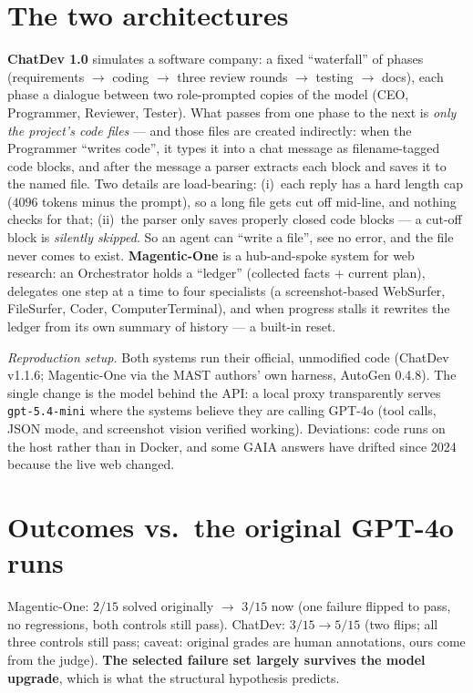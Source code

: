 \documentclass[10pt]{article}
\begin{document}
\section{The two architectures}
\textbf{ChatDev 1.0} simulates a software company: a fixed ``waterfall'' of
phases (requirements $\rightarrow$ coding $\rightarrow$ three review rounds
$\rightarrow$ testing $\rightarrow$ docs), each phase a dialogue between two
role-prompted copies of the model (CEO, Programmer, Reviewer, Tester).
What passes from one phase to the next is \emph{only the project's code
files} --- and those files are created indirectly: when the Programmer
``writes code'', it types it into a chat message as filename-tagged code
blocks, and after the message a parser extracts each block and saves it to
the named file. Two details are load-bearing: (i)~each reply has a hard
length cap ($4096$ tokens minus the prompt), so a long file gets cut off
mid-line, and nothing checks for that; (ii)~the parser only saves properly
closed code blocks --- a cut-off block is \emph{silently skipped}. So an
agent can ``write a file'', see no error, and the file never comes to
exist. \textbf{Magentic-One} is a hub-and-spoke system for web research:
an Orchestrator holds a ``ledger'' (collected facts + current plan),
delegates one step at a time to four specialists (a screenshot-based
WebSurfer, FileSurfer, Coder, ComputerTerminal), and when progress stalls it
rewrites the ledger from its own summary of history --- a built-in reset.

\emph{Reproduction setup.} Both systems run their official, unmodified code
(ChatDev v1.1.6; Magentic-One via the MAST authors' own harness, AutoGen
0.4.8). The single change is the model behind the API: a local proxy
transparently serves \texttt{gpt-5.4-mini} where the systems believe they
are calling GPT-4o (tool calls, JSON mode, and screenshot vision verified
working). Deviations: code runs on the host rather than in Docker, and some
GAIA answers have drifted since 2024 because the live web changed.

\section{Outcomes vs.\ the original GPT-4o runs}
Magentic-One: $2/15$ solved originally $\rightarrow$ $3/15$ now (one failure
flipped to pass, no regressions, both controls still pass). ChatDev: $3/15
\rightarrow 5/15$ (two flips; all three controls still pass; caveat: original
grades are human annotations, ours come from the judge). \textbf{The
selected failure set largely survives the model upgrade}, which is what the
structural hypothesis predicts.
\end{document}
